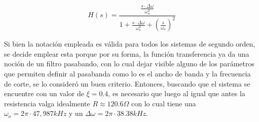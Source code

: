\begin{equation}
    H(s) = \frac{\frac{s \cdot \Delta \omega}{\omega_o^{2}}}{1 + \frac{s \cdot \Delta \omega}{\omega_o^{2}} + \left( \frac{s}{\omega_o} \right)^{2}}
\end{equation}

Si bien la notaci\'on empleada es v\'alida para todos los sistemas de segundo orden, se decide emplear esta porque por su forma,
la funci\'on transferencia ya da una noci\'on de un filtro pasabando, con lo cual dejar visible alguno de los par\'ametros que permiten
definir al pasabanda como lo es el ancho de banda y la frecuencia de corte, se lo consider\'o un buen criterio. Entonces, buscando que el sistema
se encuentre con un valor de $\xi = 0.4$, es necesario que luego al igual que antes la resistencia valga idealmente $R \approx 120.6 \Omega$ con
lo cual tiene una $\omega_o = 2 \pi \cdot 47,987kHz$ y un $\Delta \omega = 2\pi \cdot 38.38kHz$.

